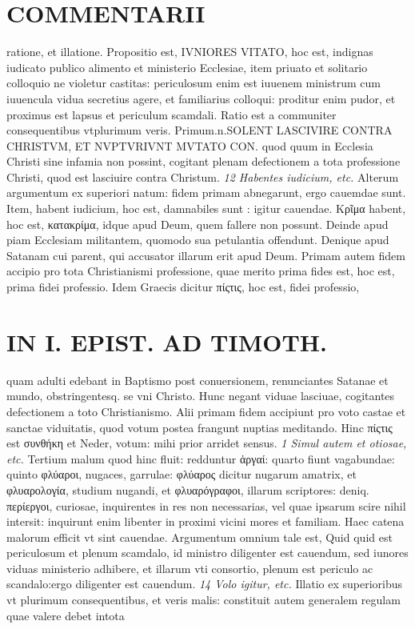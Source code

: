\documentclass{article}
\begin{document}
\begin{pages}
\section*{COMMENTARII }
\marginpar{[ p.128 ]}\pstart ratione, et illatione. Propositio est, IVNIORES VITATO, hoc est, indignas iudicato publico alimento et ministerio Ecclesiae, item priuato et solitario colloquio ne violetur castitas: periculosum enim est iuuenem ministrum cum iuuencula vidua secretius agere, et familiarius colloqui: proditur enim pudor, et proximus est lapsus et periculum scamdali. Ratio est a communiter consequentibus vtplurimum veris. Primum.n.SOLENT LASCIVIRE CONTRA CHRISTVM, ET NVPTVRIVNT MVTATO CON. quod quum in Ecclesia Christi sine infamia non possint, cogitant plenam defectionem a tota professione Christi, quod est lasciuire contra Christum.  \pend
\textit{12 Habentes iudicium, etc. }\pstart Alterum argumentum ex superiori natum: fidem primam abnegarunt, ergo cauemdae sunt. Item, habent iudicium, hoc est, damnabiles sunt : igitur cauendae. Κρῖμα habent, hoc est, κατακρίμα, idque apud Deum, quem fallere non possunt. Deinde apud piam Ecclesiam militantem, quomodo sua petulantia offendunt. Denique apud Satanam cui parent, qui accusator illarum erit apud Deum.  \pend\pstart Primam autem fidem accipio pro tota Christianismi professione, quae merito prima fides est, hoc est, prima fidei professio. Idem Graecis dicitur πίςτις, hoc est, fidei professio,  \pend
\section*{IN I. EPIST. AD TIMOTH. }
\marginpar{[ p.129 ]}\pstart quam adulti edebant in Baptismo post conuersionem, renunciantes Satanae et mundo, obstringentesq. se vni Christo. Hunc negant viduae lasciuae, cogitantes defectionem a toto Christianismo. Alii primam fidem accipiunt pro voto castae et sanctae viduitatis, quod votum postea frangunt nuptias meditando. Hinc πίςτις est συνθήκη et Neder, votum: mihi prior arridet sensus.  \pend
\textit{1 Simul autem et otiosae, etc. }\pstart Tertium malum quod hinc fluit: redduntur ἀργαί: quarto fiunt vagabundae: quinto φλύαροι, nugaces, garrulae: φλύαρος dicitur nugarum amatrix, et φλυαρολογία, studium nugandi, et φλυαρόγραφοι, illarum scriptores: deniq. περίεργοι, curiosae, inquirentes in res non necessarias, vel quae ipsarum scire nihil intersit: inquirunt enim libenter in proximi vicini mores et familiam. Haec catena malorum efficit vt sint cauendae. Argumentum omnium tale est, Quid quid est periculosum et plenum scamdalo, id ministro diligenter est cauendum, sed iunores viduas ministerio adhibere, et illarum vti consortio, plenum est periculo ac scandalo:ergo diligenter est cauendum.  \pend
\textit{14 Volo igitur, etc. }\pstart Illatio ex superioribus  vt plurimum consequentibus, et veris malis: constituit autem generalem regulam quae valere debet intota  \pend

\end{pages}
\end{document}
